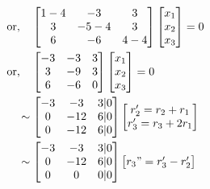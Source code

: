 \documentclass{article}
\begin{document}
\begin{align*}
    &\text{or,} \quad 
    \begin{bmatrix}
        1-4 & -3 & 3 \\
        3 & -5-4 & 3  \\
        6 & -6 & 4-4\\
    \end{bmatrix}
    \begin{bmatrix}
        x_1\\
        x_2\\
        x_3\\
    \end{bmatrix}
    = 0 \\
    &\text{or,} \quad 
    \begin{bmatrix}
        -3 & -3 & 3 \\
        3 & -9 & 3  \\
        6 & -6 & 0\\
    \end{bmatrix}
    \begin{bmatrix}
        x_1\\
        x_2\\
        x_3\\
    \end{bmatrix}
    = 0 \\
    &\text{} \quad 
    \sim\begin{bmatrix}
        -3 & -3 & 3 |0\\
        0 & -12 & 6  |0\\
        0 & -12 & 6  |0\\
    \end{bmatrix}
    \begin{bmatrix}
        r_2' = r_2 + r_1\\
        r_3' = r_3 + 2r_1\\
    \end{bmatrix}
    \\
    &\text{} \quad 
    \sim\begin{bmatrix}
        -3 & -3 & 3 |0\\
        0 & -12 & 6  |0\\
        0 & 0 & 0  |0\\
    \end{bmatrix}
    \begin{bmatrix}
        r_3" = r_3' - r_2'\\
    \end{bmatrix}   
\end{align*}
\end{document}
